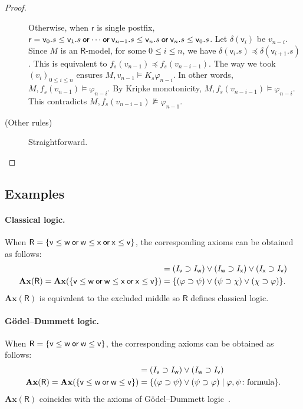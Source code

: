 \begin{proof}
\begin{description}
	   Otherwise, when $\mathsf r$ is single postfix,
	   $\mathsf r = \mathsf v_0.s\le\mathsf
	   v_1.s\mathbin{\mathsf{or}}\cdots\mathbin{\mathsf{or}}\mathsf v_{n-1}.s\le\mathsf
	   v_n.s\mathbin{\mathsf{or}}\mathsf v_n.s\le\mathsf v_0.s$.
	   Let $\delta(\mathsf v_i)$ be $v_{n-i}$.
	   Since $M$ is an $\mathsf R$-model,
	   for some $0\le i\le n$,
	   we have $\delta(\mathsf v_i.s)\preceq \delta(\mathsf
	   v_{i+1}.s)$.
	   This is equivalent to $f_s(v_{n-1})\preceq f_s(v_{n-i-1})$.
	   The way we took $(v_i)_{0\le i\le n}$ ensures
	   $M,v_{n-1}\models K_s\varphi_{n-i}$.
	   In other words, $M,f_s(v_{n-1})\models \varphi_{n-i}$.
	   By Kripke monotonicity, $M,f_s(v_{n-i-1})\models
	   \varphi_{n-i}$.
	   This contradicts $M,f_s(v_{n-i-1})\not\models\varphi_{n-1}$.
      \item[(Other rules)]
	   Straightforward.
     \end{description}
    \end{proof}

   \subsection{Examples}

    \paragraph{Classical logic.}
    When
    $\mathsf R = \{\mathsf v\le\mathsf w\mathbin{\mathsf{or}}\mathsf w\le\mathsf x\mathbin{\mathsf{or}}\mathsf x\le\mathsf
    v\}$,
    the corresponding axioms can be obtained as follows:
    \begin{align*}
     [ \mathsf v\le \mathsf w\wor \mathsf w\le\mathsf x\wor \mathsf x\le\mathsf v ] &=
     (I_{\mathsf v}\supset I_{\mathsf w})\vee (I_{\mathsf w}\supset
     I_{\mathsf x})\vee (I_{\mathsf x}\supset I_{\mathsf v})
     \\
     \mathbf{Ax}(\mathsf R) = \mathbf{Ax}(\{\mathsf v\le\mathsf w\wor \mathsf
     w\le \mathsf x \wor \mathsf x\le\mathsf v\}) &= \{(\varphi\supset\psi)\vee(\psi\supset\chi)\vee(\chi\supset\varphi)\}.
    \end{align*}
    $\mathbf{Ax}(\mathsf R)$ is equivalent to the excluded middle so $\mathsf R$ defines
    classical logic.

    \paragraph{G\"{o}del--Dummett logic.}
    When $\mathsf R=\{\mathsf v\le\mathsf w\mathbin{\mathsf{or}}\mathsf w\le\mathsf v\}$,
    the corresponding axioms can be obtained as follows:
    \begin{align*}
     [\mathsf v\le \mathsf w\wor \mathsf w\le\mathsf v] &=
     (I_{\mathsf v}\supset I_{\mathsf w})\vee (I_{\mathsf w}\supset
     I_{\mathsf v})\\
     \mathbf{Ax}(\mathsf R) = \mathbf{Ax}(\{\mathsf v\le\mathsf w\wor \mathsf
     w\le \mathsf v\}) &= \{(\varphi\supset\psi)\vee(\psi\supset\varphi)\mid
     \varphi,\psi\colon\mbox{formula}\}.
    \end{align*}
    $\mathbf{Ax}(\mathsf R)$ coincides with the axioms of
    G\"{o}del--Dummett logic~\cite{dummett59}.


